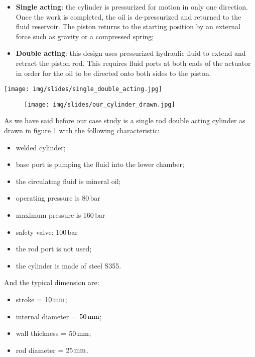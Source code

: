 \documentclass[a4paper,12pt]{article}
\begin{document}
\noindent
\begin{minipage}[c]{.6\textwidth}
\begin{itemize}
\item \textbf{Single acting}: the cylinder is pressurized for motion in only one direction. Once the work is completed, the oil is de-pressurized and returned to the fluid reservoir. The piston returns to the starting position by an external force such as gravity or a compressed spring;
\item \textbf{Double acting}: this design uses pressurized hydraulic fluid to extend and retract the piston rod. This requires fluid ports at both ends of the actuator in order for the oil to be directed onto both sides to the piston.
\end{itemize}
%
\end{minipage}
\begin{minipage}[c]{.4\textwidth}
\raggedleft
\texttt{[image: img/slides/single\_double\_acting.jpg]}
\end{minipage}
%
\begin{figure}[H]
\centering
\texttt{[image: img/slides/our\_cylinder\_drawn.jpg]}
\label{fig:our_cylinder_drawn}
\end{figure}
As we have said before our case study is a single rod double acting cylinder as drawn in figure \ref{fig:our_cylinder_drawn} with the following characteristic:
\begin{itemize}
\item welded cylinder;
\item base port is pumping the fluid into the lower chamber;
\item the circulating fluid is mineral oil;
\item operating pressure is 80\,bar
\item maximum pressure is 160\,bar
\item safety valve: 100\,bar
\item the rod port is not used;
\item the cylinder is made of steel S355.
\end{itemize}
And the typical dimension are:
\begin{itemize}
\item stroke = $10\,\text{mm}$;
\item internal diameter = $50\,\text{mm}$;
\item wall thickness = $50\,\text{mm}$;
\item rod diameter = $25\,\text{mm}$.
\end{itemize}
\end{document}
